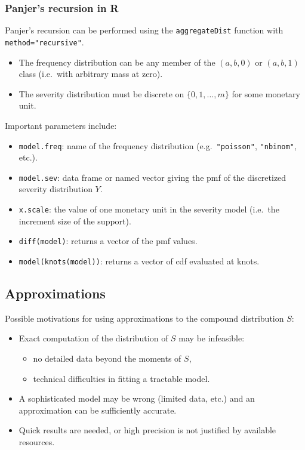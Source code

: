\documentclass[11pt]{article}
\newcommand{\noi}{\noindent}
\begin{document}
\subsubsection{Panjer’s recursion in R}
\noi Panjer’s recursion can be performed using the \texttt{aggregateDist} function with \texttt{method="recursive"}.
\begin{itemize}
  \item The frequency distribution can be any member of the \((a,b,0)\) or \((a,b,1)\) class (i.e.\ with arbitrary mass at zero).
  \item The severity distribution must be discrete on \(\{0,1,\dots,m\}\) for some monetary unit.
\end{itemize}
\noi Important parameters include:
\begin{itemize}
  \item \texttt{model.freq}: name of the frequency distribution (e.g.\ \texttt{"poisson"}, \texttt{"nbinom"}, etc.).
  \item \texttt{model.sev}: data frame or named vector giving the pmf of the discretized severity distribution \(Y\).
  \item \texttt{x.scale}: the value of one monetary unit in the severity model (i.e.\ the increment size of the support).
  \item \texttt{diff(model)}: returns a vector of the pmf values.
  \item \texttt{model(knots(model))}: returns a vector of cdf evaluated at knots.
\end{itemize}

\subsection{Approximations}

Possible motivations for using approximations to the compound distribution \(S\):
\begin{itemize}
  \item Exact computation of the distribution of \(S\) may be infeasible:
    \begin{itemize}
      \item no detailed data beyond the moments of \(S\),
      \item technical difficulties in fitting a tractable model.
    \end{itemize}
  \item A sophisticated model may be wrong (limited data, etc.) and an approximation can be sufficiently accurate.
  \item Quick results are needed, or high precision is not justified by available resources.
\end{itemize}
\end{document}
